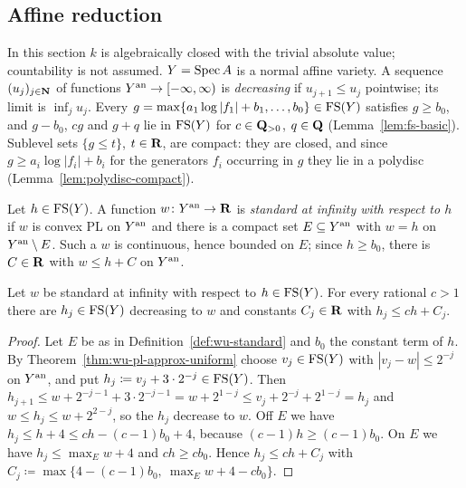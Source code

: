 \subsection{Affine reduction}\label{subsec:wu-affine}

\begin{convention}\label{conv:wu-setting}
\notready
{}
In this section $k$ is algebraically closed with the trivial absolute value; countability is not assumed.
$Y=\operatorname{Spec} A$ is a normal affine variety. A sequence $(u_j)_{j\in\mathbf{N}}$ of functions
$Y^{\mathrm{an}}\to[-\infty,\infty)$ is \emph{decreasing} if $u_{j+1}\le u_j$ pointwise; its limit is $\inf_ju_j$.
Every $g=\max\{a_1\log|f_1|+b_1,\dots,b_0\}\in\mathrm{FS}(Y)$ satisfies $g\ge b_0$, and $g-b_0$, $cg$ and $g+q$ lie in
$\mathrm{FS}(Y)$ for $c\in\mathbf{Q}_{>0}$, $q\in\mathbf{Q}$ (Lemma~\ref{lem:fs-basic}). Sublevel sets $\{g\le t\}$, $t\in\mathbf{R}$, are
compact: they are closed, and since $g\ge a_i\log|f_i|+b_i$ for the generators $f_i$ occurring in $g$
they lie in a polydisc (Lemma~\ref{lem:polydisc-compact}).
\end{convention}

\begin{definition}\label{def:wu-standard}
\notready
{}
Let $h\in\mathrm{FS}(Y)$. A function $w\colon Y^{\mathrm{an}}\to\mathbf{R}$ is \emph{standard at infinity with respect to $h$} if
$w$ is convex PL on $Y^{\mathrm{an}}$ and there is a compact set $E\subseteq Y^{\mathrm{an}}$ with $w=h$ on $Y^{\mathrm{an}}\setminus E$.
Such a $w$ is continuous, hence bounded on $E$; since $h\ge b_0$, there is $C\in\mathbf{R}$ with $w\le h+C$ on
$Y^{\mathrm{an}}$.
\end{definition}

\begin{theorem}\label{thm:wu-pl-approx}
\leanok
{}
Let $w$ be standard at infinity with respect to $h\in\mathrm{FS}(Y)$. For every rational $c>1$ there are
$h_j\in\mathrm{FS}(Y)$ decreasing to $w$ and constants $C_j\in\mathbf{R}$ with $h_j\le ch+C_j$.
\end{theorem}

\begin{proof}
Let $E$ be as in Definition~\ref{def:wu-standard} and $b_0$ the constant term of $h$. By
Theorem~\ref{thm:wu-pl-approx-uniform} choose $v_j\in\mathrm{FS}(Y)$ with $|v_j-w|\le2^{-j}$ on $Y^{\mathrm{an}}$, and put
$h_j\coloneqq v_j+3\cdot2^{-j}\in\mathrm{FS}(Y)$. Then
$h_{j+1}\le w+2^{-j-1}+3\cdot2^{-j-1}=w+2^{1-j}\le v_j+2^{-j}+2^{1-j}=h_j$ and $w\le h_j\le w+2^{2-j}$, so
the $h_j$ decrease to $w$. Off $E$ we have $h_j\le h+4\le ch-(c-1)b_0+4$, because $(c-1)h\ge(c-1)b_0$. On
$E$ we have $h_j\le\max_Ew+4$ and $ch\ge cb_0$. Hence $h_j\le ch+C_j$ with
$C_j\coloneqq\max\{4-(c-1)b_0,\ \max_Ew+4-cb_0\}$.
\end{proof}

